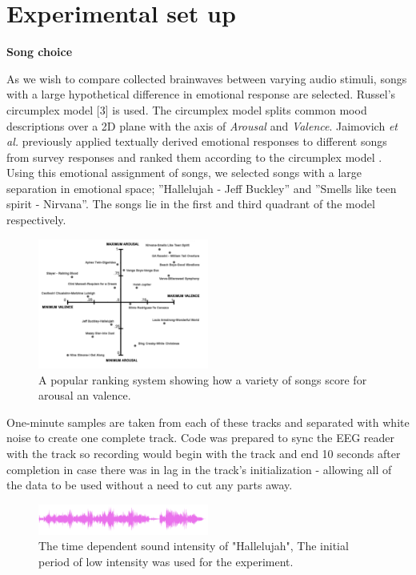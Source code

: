 \documentclass[twocolumn,superscriptaddress]{revtex4-1}
\theoremstyle{definition}
\theoremstyle{remark}
\begin{document}
\section{Experimental set up}  \label{exper}%


\begin{center}
\textbf{Song choice}
\end{center} 

As we wish to compare collected brainwaves between varying audio stimuli, songs with a large hypothetical difference in emotional response are selected. Russel’s circumplex model [3] is used. The circumplex model splits common mood descriptions over a 2D plane with the axis of \emph{Arousal} and \emph{Valence}. Jaimovich \emph{et al.} previously applied textually derived emotional responses to different songs from survey responses and ranked them according to the circumplex model \cite{musictype}. Using this emotional assignment of songs, we selected songs with a large separation in emotional space; ”Hallelujah - Jeff Buckley” and ”Smells like teen spirit - Nirvana”. The songs lie in the first and third quadrant of the model respectively.

\begin{figure}[h!]
  \centering
      \includegraphics[width=0.5\textwidth]{song_choice}
  \caption{A popular ranking system showing how a variety of songs score for arousal an valence.}
\end{figure}

One-minute samples are taken from each of these tracks and separated with white noise to create one complete track. Code was prepared to sync the EEG reader with the track so recording would begin with the track and end 10 seconds after completion in case there was in lag in the track’s initialization - allowing all of the data to be used without a need to cut any parts away. 

\begin{figure}[h!]
  \centering
      \includegraphics[width=0.5\textwidth]{jeffbuckley}
  \caption{The time dependent sound intensity of "Hallelujah", The initial period of low intensity was used for the experiment.}
\end{figure}
\end{document}

